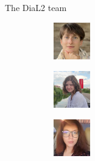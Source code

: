 \documentclass[
  ignorenonframetext,
  t]{beamer}
\begin{document}
\begin{frame}{The DiaL2 team}
\label{the-dial2-team}
\begin{figure}

\begin{minipage}{0.25\linewidth}

\begin{figure}[H]

{\centering \includegraphics[width=0.63in,height=\textheight]{images/yermolova.jpeg}

}


\end{figure}%

\end{minipage}%
%
\begin{minipage}{0.25\linewidth}

\begin{figure}[H]

{\centering \includegraphics[width=0.63in,height=\textheight]{images/grishanova.png}

}


\end{figure}%

\end{minipage}%
%
\begin{minipage}{0.25\linewidth}

\begin{figure}[H]

{\centering \includegraphics[width=0.63in,height=\textheight]{images/koshelyuk.jpeg}

}


\end{figure}%


\end{minipage}
\end{figure}
\end{frame}
\end{document}
